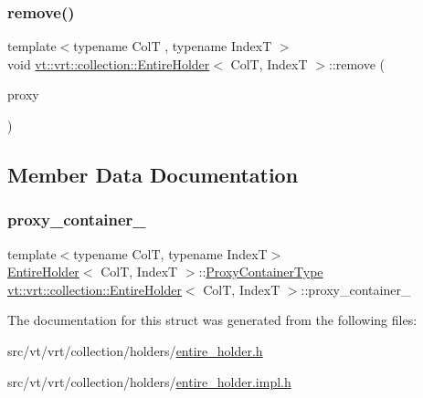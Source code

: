 \mbox{\label{structvt_1_1vrt_1_1collection_1_1_entire_holder_a4f73d44389663ab464cb7f48e2b27fb2}} 
\subsubsection{\texorpdfstring{remove()}{remove()}}
{\footnotesize\ttfamily template$<$typename ColT , typename IndexT $>$ \\
void \hyperlink{structvt_1_1vrt_1_1collection_1_1_entire_holder}{vt\+::vrt\+::collection\+::\+Entire\+Holder}$<$ ColT, IndexT $>$\+::remove (\begin{DoxyParamCaption}\item[{\hyperlink{namespacevt_a1b417dd5d684f045bb58a0ede70045ac}{Virtual\+Proxy\+Type} const \&}]{proxy }\end{DoxyParamCaption})\hspace{0.3cm}{\ttfamily [static]}}



\subsection{Member Data Documentation}
\mbox{\label{structvt_1_1vrt_1_1collection_1_1_entire_holder_aa2fccfb10abea9c3cdd0987f6eff5ccb}} 
\subsubsection{\texorpdfstring{proxy\+\_\+container\+\_\+}{proxy\_container\_}}
{\footnotesize\ttfamily template$<$typename ColT, typename IndexT$>$ \\
\hyperlink{structvt_1_1vrt_1_1collection_1_1_entire_holder}{Entire\+Holder}$<$ ColT, IndexT $>$\+::\hyperlink{structvt_1_1vrt_1_1collection_1_1_entire_holder_a40524236d95912099482d033b337db81}{Proxy\+Container\+Type} \hyperlink{structvt_1_1vrt_1_1collection_1_1_entire_holder}{vt\+::vrt\+::collection\+::\+Entire\+Holder}$<$ ColT, IndexT $>$\+::proxy\+\_\+container\+\_\+\hspace{0.3cm}{\ttfamily [static]}}



The documentation for this struct was generated from the following files\+:\begin{DoxyCompactItemize}
\item 
src/vt/vrt/collection/holders/\hyperlink{entire__holder_8h}{entire\+\_\+holder.\+h}\item 
src/vt/vrt/collection/holders/\hyperlink{entire__holder_8impl_8h}{entire\+\_\+holder.\+impl.\+h}\end{DoxyCompactItemize}
